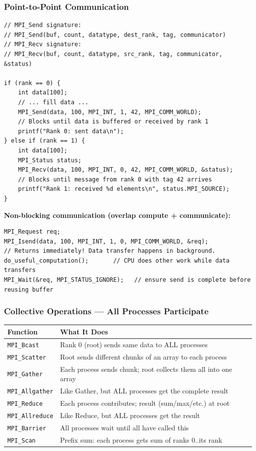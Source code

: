 \documentclass[11pt,a4paper]{article}
\newcommand{\code}[1]{\texttt{\small\colorbox{codebg}{\color{codekw}#1}}}
\begin{document}
\subsubsection{Point-to-Point Communication}

\begin{lstlisting}
// MPI_Send signature:
// MPI_Send(buf, count, datatype, dest_rank, tag, communicator)
// MPI_Recv signature:
// MPI_Recv(buf, count, datatype, src_rank, tag, communicator, &status)

if (rank == 0) {
    int data[100];
    // ... fill data ...
    MPI_Send(data, 100, MPI_INT, 1, 42, MPI_COMM_WORLD);
    // Blocks until data is buffered or received by rank 1
    printf("Rank 0: sent data\n");
} else if (rank == 1) {
    int data[100];
    MPI_Status status;
    MPI_Recv(data, 100, MPI_INT, 0, 42, MPI_COMM_WORLD, &status);
    // Blocks until message from rank 0 with tag 42 arrives
    printf("Rank 1: received %d elements\n", status.MPI_SOURCE);
}
\end{lstlisting}

\textbf{Non-blocking communication (overlap compute + communicate):}
\begin{lstlisting}
MPI_Request req;
MPI_Isend(data, 100, MPI_INT, 1, 0, MPI_COMM_WORLD, &req);
// Returns immediately! Data transfer happens in background.
do_useful_computation();       // CPU does other work while data transfers
MPI_Wait(&req, MPI_STATUS_IGNORE);   // ensure send is complete before reusing buffer
\end{lstlisting}

\subsubsection{Collective Operations --- All Processes Participate}

\begin{center}
\begin{tabular}{L{3.5cm} L{10cm}}
\toprule
\textbf{Function} & \textbf{What It Does} \\
\midrule
\code{MPI\_Bcast} & Rank 0 (root) sends same data to ALL processes \\
\code{MPI\_Scatter} & Root sends different chunks of an array to each process \\
\code{MPI\_Gather} & Each process sends chunk; root collects them all into one array \\
\code{MPI\_Allgather} & Like Gather, but ALL processes get the complete result \\
\code{MPI\_Reduce} & Each process contributes; result (sum/max/etc.) at root \\
\code{MPI\_Allreduce} & Like Reduce, but ALL processes get the result \\
\code{MPI\_Barrier} & All processes wait until all have called this \\
\code{MPI\_Scan} & Prefix sum: each process gets sum of ranks 0..its rank \\
\bottomrule
\end{tabular}
\end{center}
\end{document}
